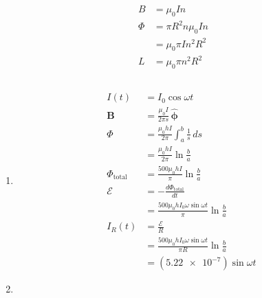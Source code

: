 \documentclass{article}
\renewcommand{\vec}[1]{\boldsymbol{\mathbf{#1}}}
\newcommand{\uvec}[1]{\hat{\vec{#1}}}
\begin{document}
\begin{align*}
  B    & = \mu_0 I n           \\
  \Phi & = \pi R^2 n \mu_0 I n \\
       & = \mu_0 \pi I n^2 R^2 \\
  L    & = \mu_0 \pi n^2 R^2
\end{align*}

\setcounter{subsection}{25}
\subsection{}

\begin{enumerate}
  \item

        \begin{align*}
          I(t)              & = I_0 \cos \omega t                                                  \\
          \vec{B}           & = \frac{\mu_0 I}{2 \pi s} \,\uvec{\phi}                              \\
          \Phi              & = \frac{\mu_0 h I}{2 \pi} \int_a^b \frac{1}{s} \,d s                 \\
                            & = \frac{\mu_0 h I}{2 \pi} \ln \frac{b}{a}                            \\
          \Phi_\text{total} & = \frac{500 \mu_0 h I}{\pi} \ln \frac{b}{a}                          \\
          \mathcal{E}       & = -\frac{d \Phi_\text{total}}{d t}                                   \\
                            & = \frac{500 \mu_0 h I_0 \omega \sin \omega t}{\pi} \ln \frac{b}{a}   \\
          I_R(t)            & = \frac{\mathcal{E}}{R}                                              \\
                            & = \frac{500 \mu_0 h I_0 \omega \sin \omega t}{\pi R} \ln \frac{b}{a} \\
                            & = (\num{5.22e-7}) \sin \omega t
        \end{align*}

  \item


\end{enumerate}
\end{document}
